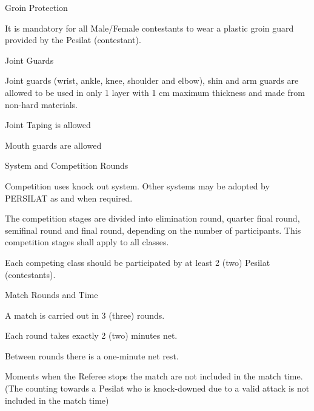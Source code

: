 \begin{legal}
\begin{legal}
    \item Groin Protection
    
    It is mandatory for all Male/Female contestants to wear a plastic groin guard provided by the Pesilat (contestant).

    \item Joint Guards

    Joint guards (wrist, ankle, knee, shoulder and elbow), shin and arm guards are allowed to be used in only 1 layer with 1 cm maximum thickness and made from non-hard materials.

    \item Joint Taping is allowed

    \item Mouth guards are allowed
    \end{legal}

\item System and Competition Rounds
    \begin{legal}
    \item Competition uses knock out system. Other systems may be adopted by PERSILAT as and when required.
    \item The competition stages are divided into elimination round, quarter final round, semifinal round and final round, depending on the number of participants. This competition stages shall apply to all classes.
    \item Each competing class should be participated by at least 2 (two) Pesilat (contestants).
    \end{legal}

\item Match Rounds and Time
    \begin{legal}
    \item A match is carried out in 3 (three) rounds. 
    \item Each round takes exactly 2 (two) minutes net. 
    \item Between rounds there is a one-minute net rest.
    \item Moments when the Referee stops the match are not included in the match time. (The counting towards a Pesilat who is knock-downed due to a valid attack is not included in the match time)
    \end{legal}



\end{legal}
